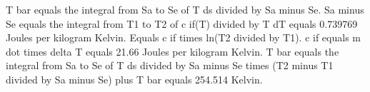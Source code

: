 T bar equals the integral from Sa to Se of T ds divided by Sa minus Se.  
Sa minus Se equals the integral from T1 to T2 of c if(T) divided by T dT equals 0.739769 Joules per kilogram Kelvin.  
Equals c if times ln(T2 divided by T1).  
c if equals m dot times delta T equals 21.66 Joules per kilogram Kelvin.  
T bar equals the integral from Sa to Se of T ds divided by Sa minus Se times (T2 minus T1 divided by Sa minus Se) plus T bar equals 254.514 Kelvin.